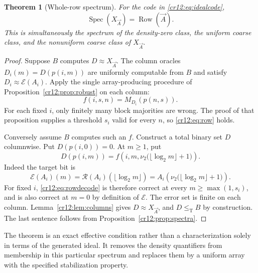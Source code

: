 \documentclass[11pt,letterpaper]{article}
\theoremstyle{plain}
\newtheorem{theorem}{Theorem}[section]
\theoremstyle{definition}
\theoremstyle{remark}
\numberwithin{equation}{section}
\newcommand{\leT}{\leq_{\mathrm T}}
\newcommand{\Spec}{\operatorname{Spec}}
\newcommand{\Row}{\operatorname{Row}}
\newcommand{\Rcode}{\mathcal R}
\newcommand{\Ecode}{\mathcal E}
\begin{document}
\begin{theorem}[Whole-row spectrum]\label{cr12:thm:rows}
For the code in \eqref{cr12:eq:idealcode},
\begin{equation}\label{cr12:eq:rowspec}
 \Spec(X_{\vec A})=\Row(\vec A).
\end{equation}
This is simultaneously the spectrum of the density-zero class, the uniform
coarse class, and the nonuniform coarse class of $X_{\vec A}$.
\end{theorem}
\begin{proof}
Suppose $B$ computes $D\approx X_{\vec A}$. The column oracles
$D_i(m)=D(p(i,m))$ are uniformly computable from $B$ and satisfy
$D_i\approx\Ecode(A_i)$. Apply the single array-producing procedure of
Proposition~\ref{cr12:prop:robust} on each column:
\[
 f(i,s,n)=M_{D_i}(p(n,s)).
\]
For each fixed $i$, only finitely many block majorities are wrong. The proof
of that proposition supplies a threshold $s_i$ valid for every $n$, so
\eqref{cr12:eq:row} holds.

Conversely assume $B$ computes such an $f$. Construct a total binary set $D$
columnwise. Put $D(p(i,0))=0$. At $m\ge1$, put
\begin{equation}\label{cr12:eq:rowdecode}
 D(p(i,m))=f\!\left(i,m,
       \nu_2\bigl(\lfloor\log_2m\rfloor+1\bigr)\right).
\end{equation}
Indeed the target bit is
\[
 \Ecode(A_i)(m)
 =\Rcode(A_i)(\lfloor\log_2m\rfloor)
 =A_i\!\left(\nu_2\bigl(\lfloor\log_2m\rfloor+1\bigr)\right).
\]
For fixed $i$, \eqref{cr12:eq:rowdecode} is therefore correct at every
$m\ge\max(1,s_i)$, and is also correct at $m=0$ by definition of $\Ecode$.
The error set is finite on each column. Lemma~\ref{cr12:lem:columns} gives
$D\approx X_{\vec A}$, and $D\leT B$ by construction.
The last sentence follows from Proposition~\ref{cr12:prop:spectra}.
\end{proof}

The theorem is an exact effective condition rather than a characterization
solely in terms of the generated ideal. It removes the density quantifiers
from membership in this particular spectrum and replaces them by a uniform
array with the specified stabilization property.
\end{document}
